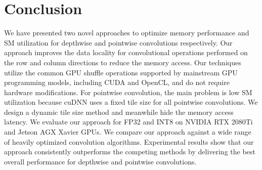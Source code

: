 \section{Conclusion}
We have presented two novel approaches to optimize memory performance and SM utilization for depthwise and pointwise convolutions respectively. 
Our approach improves the data locality for convolutional operations performed on the row and column directions to reduce the memory access. 
Our techniques utilize the common GPU shuffle operations supported by mainstream GPU programming models, including CUDA and OpenCL, and do not require hardware modifications.
For pointwise convolution, the main problem is low SM utilization because cuDNN uses a fixed tile size for all pointwise convolutions. We design a dynamic tile size method and meanwhile hide the memory access latency. 
We evaluate our approach for FP32 and INT8 on NVIDIA RTX 2080Ti and Jetson AGX Xavier GPUs. 
We compare our approach against a wide range of heavily optimized convolution algorithms. 
Experimental results show that our approach consistently outperforms the competing methods by delivering the best overall performance for depthwise and pointwise convolutions.




